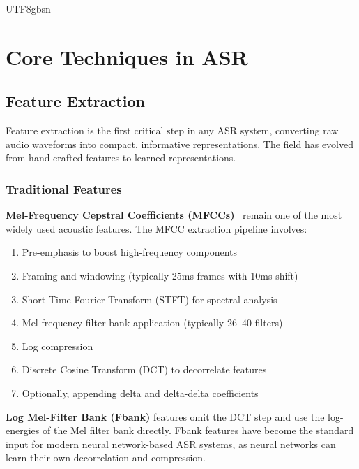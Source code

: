 \documentclass[12pt,a4paper]{article}
\begin{document}
\begin{CJK}{UTF8}{gbsn}
\section{Core Techniques in ASR}
\label{sec:techniques}

\subsection{Feature Extraction}
\label{subsec:features}

Feature extraction is the first critical step in any ASR system, converting raw audio waveforms into compact, informative representations. The field has evolved from hand-crafted features to learned representations.

\subsubsection{Traditional Features}

\textbf{Mel-Frequency Cepstral Coefficients (MFCCs)}~\cite{davis1980comparison} remain one of the most widely used acoustic features. The MFCC extraction pipeline involves:
\begin{enumerate}[leftmargin=*]
    \item Pre-emphasis to boost high-frequency components
    \item Framing and windowing (typically 25ms frames with 10ms shift)
    \item Short-Time Fourier Transform (STFT) for spectral analysis
    \item Mel-frequency filter bank application (typically 26--40 filters)
    \item Log compression
    \item Discrete Cosine Transform (DCT) to decorrelate features
    \item Optionally, appending delta and delta-delta coefficients
\end{enumerate}

\textbf{Log Mel-Filter Bank (Fbank)} features omit the DCT step and use the log-energies of the Mel filter bank directly. Fbank features have become the standard input for modern neural network-based ASR systems, as neural networks can learn their own decorrelation and compression.


\end{CJK}
\end{document}
